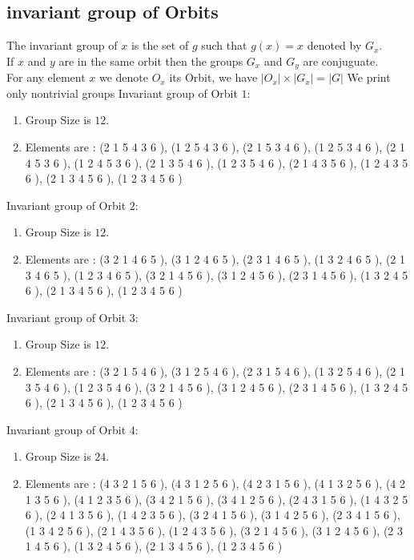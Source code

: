 \documentclass[12pt]{article}
\begin{document}
\subsection{invariant group of Orbits}
\noindent The invariant group of $x$ is the set of $g$ such that $g(x)=x$ denoted by $G_x$.\\
If $x$ and $y$ are in the same orbit then the groups $G_x$ and  $G_y$ are conjuguate.\\
For any element $x$ we denote $O_x$ its Orbit, we have $|O_x|\times |G_x|=|G|$
We print only nontrivial groups
Invariant group of Orbit $1$:
\begin{enumerate}
\item Group Size is $12$.
\item Elements are : (2 1 5 4 3 6  ), (1 2 5 4 3 6  ), (2 1 5 3 4 6  ), (1 2 5 3 4 6  ), (2 1 4 5 3 6  ), (1 2 4 5 3 6  ), (2 1 3 5 4 6  ), (1 2 3 5 4 6  ), (2 1 4 3 5 6  ), (1 2 4 3 5 6  ), (2 1 3 4 5 6  ), (1 2 3 4 5 6  )
\end{enumerate}
Invariant group of Orbit $2$:
\begin{enumerate}
\item Group Size is $12$.
\item Elements are : (3 2 1 4 6 5  ), (3 1 2 4 6 5  ), (2 3 1 4 6 5  ), (1 3 2 4 6 5  ), (2 1 3 4 6 5  ), (1 2 3 4 6 5  ), (3 2 1 4 5 6  ), (3 1 2 4 5 6  ), (2 3 1 4 5 6  ), (1 3 2 4 5 6  ), (2 1 3 4 5 6  ), (1 2 3 4 5 6  )
\end{enumerate}
Invariant group of Orbit $3$:
\begin{enumerate}
\item Group Size is $12$.
\item Elements are : (3 2 1 5 4 6  ), (3 1 2 5 4 6  ), (2 3 1 5 4 6  ), (1 3 2 5 4 6  ), (2 1 3 5 4 6  ), (1 2 3 5 4 6  ), (3 2 1 4 5 6  ), (3 1 2 4 5 6  ), (2 3 1 4 5 6  ), (1 3 2 4 5 6  ), (2 1 3 4 5 6  ), (1 2 3 4 5 6  )
\end{enumerate}
Invariant group of Orbit $4$:
\begin{enumerate}
\item Group Size is $24$.
\item Elements are : (4 3 2 1 5 6  ), (4 3 1 2 5 6  ), (4 2 3 1 5 6  ), (4 1 3 2 5 6  ), (4 2 1 3 5 6  ), (4 1 2 3 5 6  ), (3 4 2 1 5 6  ), (3 4 1 2 5 6  ), (2 4 3 1 5 6  ), (1 4 3 2 5 6  ), (2 4 1 3 5 6  ), (1 4 2 3 5 6  ), (3 2 4 1 5 6  ), (3 1 4 2 5 6  ), (2 3 4 1 5 6  ), (1 3 4 2 5 6  ), (2 1 4 3 5 6  ), (1 2 4 3 5 6  ), (3 2 1 4 5 6  ), (3 1 2 4 5 6  ), (2 3 1 4 5 6  ), (1 3 2 4 5 6  ), (2 1 3 4 5 6  ), (1 2 3 4 5 6  )
\end{enumerate}
\end{document}
